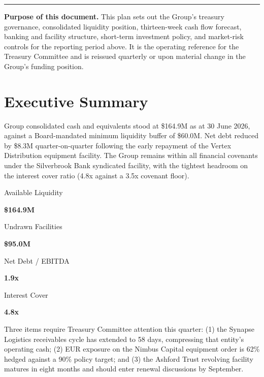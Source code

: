 \documentclass[11pt,a4paper]{scrreprt}
\newcommand{\metric}[2]{%
  {\color{treasurymuted}\small #1}\par
  {\color{treasurynavy}\bfseries\Large #2}%
}
\begin{document}
\vspace{0.9cm}
\noindent\textcolor{treasurymuted}{\rule{\linewidth}{0.4pt}}

\vspace{0.4cm}
\noindent\textbf{\color{treasurynavy}Purpose of this document.} This plan sets out the
Group's treasury governance, consolidated liquidity position, thirteen-week cash flow
forecast, banking and facility structure, short-term investment policy, and market-risk
controls for the reporting period above. It is the operating reference for the Treasury
Committee and is reissued quarterly or upon material change in the Group's funding
position.

\vspace{1.2cm}

\section{Executive Summary}

Group consolidated cash and equivalents stood at \$164.9M as at 30 June 2026, against a
Board-mandated minimum liquidity buffer of \$60.0M. Net debt reduced by \$8.3M
quarter-on-quarter following the early repayment of the Vertex Distribution equipment
facility. The Group remains within all financial covenants under the Silverbrook Bank
syndicated facility, with the tightest headroom on the interest cover ratio (4.8x against
a 3.5x covenant floor).

\begin{minipage}{0.24\textwidth}
\metric{Available Liquidity}{\$164.9M}
\end{minipage}\hfill
\begin{minipage}{0.24\textwidth}
\metric{Undrawn Facilities}{\$95.0M}
\end{minipage}\hfill
\begin{minipage}{0.24\textwidth}
\metric{Net Debt / EBITDA}{1.9x}
\end{minipage}\hfill
\begin{minipage}{0.24\textwidth}
\metric{Interest Cover}{4.8x}
\end{minipage}
\par
\vspace{0.6cm}

Three items require Treasury Committee attention this quarter: (1) the Synapse Logistics
receivables cycle has extended to 58 days, compressing that entity's operating cash; (2) EUR
exposure on the Nimbus Capital equipment order is 62\% hedged against a 90\% policy target;
and (3) the Ashford Trust revolving facility matures in eight months and should enter
renewal discussions by September.
\end{document}

